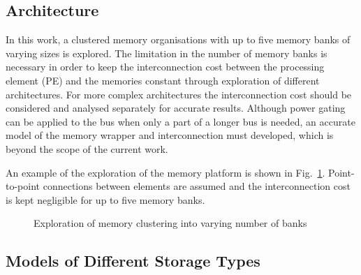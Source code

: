 \documentclass{acm_proc_article-sp}
\begin{document}
\subsection{Architecture}

In this work, a clustered memory organisations with up to five memory banks of varying sizes is explored. The limitation in the number of memory banks is necessary in order to keep the interconnection cost between the processing element (PE) and the memories constant through exploration of different architectures. For more complex architectures the interconnection cost should be considered and analysed separately for accurate results. Although power gating can be applied to the bus when only a part of a longer bus is needed, an accurate model of the memory wrapper and interconnection must developed, which is beyond the scope of the current work. 

An example of the exploration of the memory platform is shown in Fig.~\ref{fig:platform}. Point-to-point connections between elements are assumed and the interconnection cost is kept negligible for up to five memory banks.

\begin{figure}[!t]
\centering
\caption{Exploration of memory clustering into varying number of banks}
\label{fig:platform}
\end{figure}

\subsection{Models of Different Storage Types}
\end{document}
